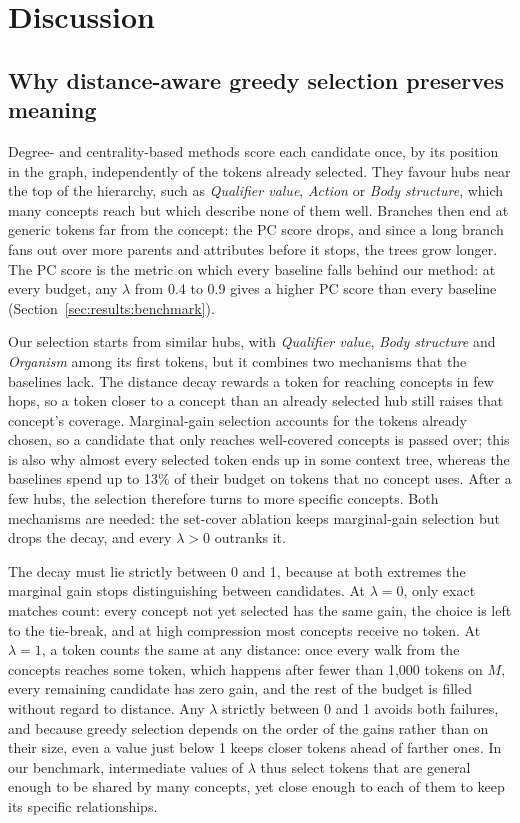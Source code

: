 \section{Discussion}
\label{sec:discussion}

\subsection{Why distance-aware greedy selection preserves meaning}
\label{sec:discussion:why}

Degree- and centrality-based methods score each candidate once, by its position in the graph, independently of the tokens already selected.
They favour hubs near the top of the hierarchy, such as \textit{Qualifier value}, \textit{Action} or \textit{Body structure}, which many concepts reach but which describe none of them well.
Branches then end at generic tokens far from the concept: the PC score drops, and since a long branch fans out over more parents and attributes before it stops, the trees grow longer.
The PC score is the metric on which every baseline falls behind our method: at every budget, any $\lambda$ from 0.4 to 0.9 gives a higher PC score than every baseline (Section~\ref{sec:results:benchmark}).

Our selection starts from similar hubs, with \textit{Qualifier value}, \textit{Body structure} and \textit{Organism} among its first tokens, but it combines two mechanisms that the baselines lack.
The distance decay rewards a token for reaching concepts in few hops, so a token closer to a concept than an already selected hub still raises that concept's coverage.
Marginal-gain selection accounts for the tokens already chosen, so a candidate that only reaches well-covered concepts is passed over; this is also why almost every selected token ends up in some context tree, whereas the baselines spend up to 13\% of their budget on tokens that no concept uses.
After a few hubs, the selection therefore turns to more specific concepts.
Both mechanisms are needed: the set-cover ablation keeps marginal-gain selection but drops the decay, and every $\lambda > 0$ outranks it.

The decay must lie strictly between 0 and 1, because at both extremes the marginal gain stops distinguishing between candidates.
At $\lambda = 0$, only exact matches count: every concept not yet selected has the same gain, the choice is left to the tie-break, and at high compression most concepts receive no token.
At $\lambda = 1$, a token counts the same at any distance: once every walk from the concepts reaches some token, which happens after fewer than 1,000 tokens on $M$, every remaining candidate has zero gain, and the rest of the budget is filled without regard to distance.
Any $\lambda$ strictly between 0 and 1 avoids both failures, and because greedy selection depends on the order of the gains rather than on their size, even a value just below 1 keeps closer tokens ahead of farther ones.
In our benchmark, intermediate values of $\lambda$ thus select tokens that are general enough to be shared by many concepts, yet close enough to each of them to keep its specific relationships.

